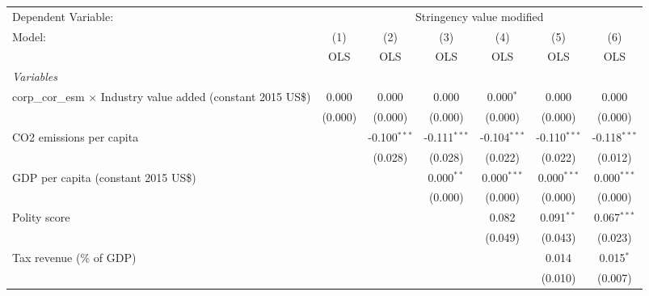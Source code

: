 
\begingroup
\centering
\begin{tabular}{lcccccc}
   \toprule
   Dependent Variable: & \multicolumn{6}{c}{Stringency value modified}\\
   Model:                                                                & (1)     & (2)            & (3)            & (4)            & (5)            & (6)\\  
                                                                         &  OLS    & OLS            & OLS            & OLS            & OLS            & OLS\\  
   \midrule
   \emph{Variables}\\
   corp\_cor\_esm $\times$ Industry value added (constant 2015 US\$)     & 0.000   & 0.000          & 0.000          & 0.000$^{*}$    & 0.000          & 0.000\\   
                                                                         & (0.000) & (0.000)        & (0.000)        & (0.000)        & (0.000)        & (0.000)\\   
   CO2 emissions per capita                                              &         & -0.100$^{***}$ & -0.111$^{***}$ & -0.104$^{***}$ & -0.110$^{***}$ & -0.118$^{***}$\\   
                                                                         &         & (0.028)        & (0.028)        & (0.022)        & (0.022)        & (0.012)\\   
   GDP per capita (constant 2015 US\$)                                   &         &                & 0.000$^{**}$   & 0.000$^{***}$  & 0.000$^{***}$  & 0.000$^{***}$\\   
                                                                         &         &                & (0.000)        & (0.000)        & (0.000)        & (0.000)\\   
   Polity score                                                          &         &                &                & 0.082          & 0.091$^{**}$   & 0.067$^{***}$\\   
                                                                         &         &                &                & (0.049)        & (0.043)        & (0.023)\\   
   Tax revenue (\% of GDP)                                               &         &                &                &                & 0.014          & 0.015$^{*}$\\   
                                                                         &         &                &                &                & (0.010)        & (0.007)\\   

\end{tabular}
